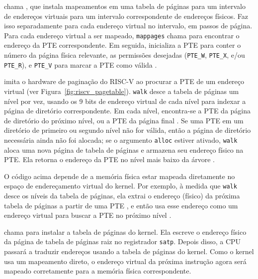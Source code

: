 chama
,
que
instala mapeamentos em uma tabela de páginas
para um intervalo de endereços virtuais para
um intervalo correspondente de endereços físicos.
Faz isso separadamente para cada endereço virtual no intervalo,
em passos de página.
Para cada endereço virtual a ser mapeado,
\lstinline{mappages}
chama
para encontrar o endereço da PTE correspondente.
Em seguida, inicializa a PTE para conter o número da página física relevante,
as permissões desejadas 
(\lstinline{PTE_W},
\lstinline{PTE_X},
e/ou
\lstinline{PTE_R}),
e
\lstinline{PTE_V}
para marcar a PTE como válida
.

imita o hardware de paginação do RISC-V ao
procurar a PTE de um endereço virtual (ver
Figura~\ref{fig:riscv_pagetable}).
\lstinline{walk}
desce a tabela de páginas um nível por vez,
usando os 9 bits de endereço virtual de cada nível para
indexar a página de diretório correspondente.
Em cada nível, encontra-se a PTE da
página de diretório do próximo nível, ou a PTE da
página final
.
Se uma PTE em um diretório de primeiro ou segundo nível
não for válida, então a página de diretório necessária
ainda não foi alocada;
se o argumento
\lstinline{alloc}
estiver ativado,
\lstinline{walk}
aloca uma nova página de tabela de páginas e armazena seu endereço físico na PTE.
Ela retorna o endereço da PTE no nível mais baixo da árvore
.

O código acima depende de a memória física estar mapeada diretamente no
espaço de endereçamento virtual do kernel. Por exemplo, à medida que \lstinline{walk} desce os níveis
da tabela de páginas, ela extrai o endereço (físico) da
próxima tabela de páginas a partir de uma PTE ,
e então usa esse endereço como um
endereço virtual para buscar a PTE no próximo nível
.

chama
para instalar a tabela de páginas do kernel.
Ela escreve o endereço físico da página de tabela de páginas raiz
no registrador
\texttt{satp}.
Depois disso, a CPU passará a traduzir endereços usando a tabela
de páginas do kernel. Como o kernel usa um mapeamento direto, o
endereço virtual da próxima instrução agora será mapeado corretamente para a
memória física correspondente.

